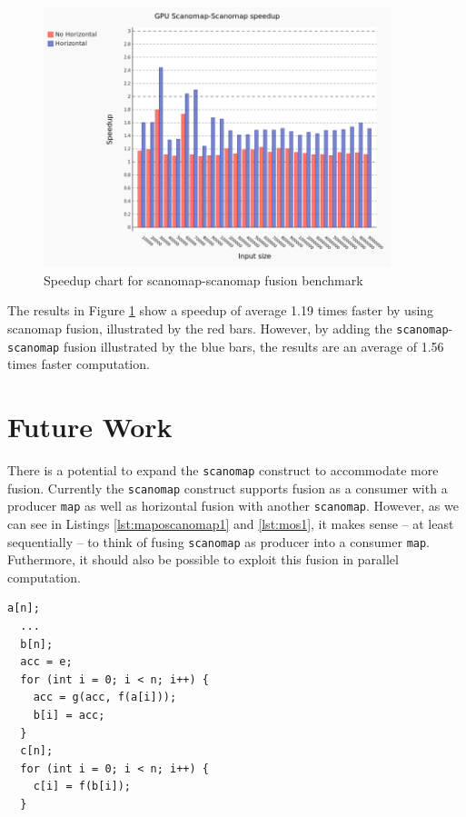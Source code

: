\documentclass[11pt,bibliography=totocnumbered]{article}
\begin{document}
\begin{figure}[hb]
  \centering
    \includegraphics[width=0.9\textwidth]{images/horri-comparing.png}
  \caption{Speedup chart for scanomap-scanomap fusion benchmark}
  \label{fig:scanomap-scanomap}
\end{figure}

The results in Figure \ref{fig:scanomap-scanomap} show a speedup of average 1.19 times faster by using scanomap fusion, illustrated by the red bars. However, by adding the \texttt{scanomap}-\texttt{scanomap} fusion illustrated by the blue bars, the results are an average of 1.56 times faster computation.

\section{Future Work}
There is a potential to expand the \texttt{scanomap} construct to accommodate more fusion. Currently the \texttt{scanomap} construct supports fusion as a consumer with a producer \texttt{map} as well
 as horizontal fusion with another \texttt{scanomap}. However, as we can see in Listings \ref{lst:maposcanomap1} and \ref{lst:mos1}, it makes sense
 -- at least sequentially -- to think of fusing \texttt{scanomap} as producer into
 a consumer \texttt{map}. Futhermore, it should also be possible to exploit this fusion in parallel computation.

\begin{lstlisting}[caption=$\mathtt{scanomap} \: g \: g_f \: ne \: a$ and $\mathtt{map} \: h \: b$ as sequential loops., label={lst:maposcanomap1}]
  a[n];
  ...
  b[n];
  acc = e;
  for (int i = 0; i < n; i++) {
    acc = g(acc, f(a[i]));
    b[i] = acc;
  }
  c[n];
  for (int i = 0; i < n; i++) {
    c[i] = f(b[i]);
  }
\end{lstlisting}
\end{document}
